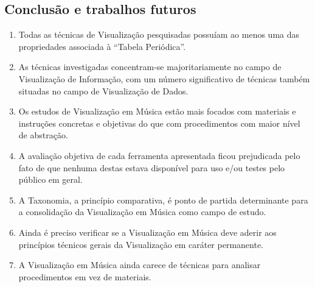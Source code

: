 \documentclass{sciposter}
\begin{document}
\begin{multicols}{3}

\section{Conclusão e trabalhos futuros}

\begin{enumerate}
\item Todas as técnicas de Visualização pesquisadas possuíam ao menos
  uma das propriedades associada à ``Tabela Periódica''.
\item As técnicas investigadas concentram-se majoritariamente no campo
  de Visualização de Informação, com um número significativo de
  técnicas também situadas no campo de Visualização de Dados.
\item Os estudos de Visualização em Música estão mais focados com
  materiais e instruções concretas e objetivas do que com
  procedimentos com maior nível de abstração.
\item A avaliação objetiva de cada ferramenta apresentada ficou
  prejudicada pelo fato de que nenhuma destas estava disponível para
  uso e/ou testes pelo público em geral.
\item A Taxonomia, a princípio comparativa, é ponto de partida
  determinante para a consolidação da Visualização em Música como
  campo de estudo.
\item Ainda é preciso verificar se a Visualização em Música deve
  aderir aos princípios técnicos gerais da Visualização em caráter
  permanente.
\item A Visualização em Música ainda carece de técnicas para analisar
  procedimentos em vez de materiais.
\end{enumerate}

\renewcommand{\refname}{Bibliografia}



\end{multicols}
\end{document}
